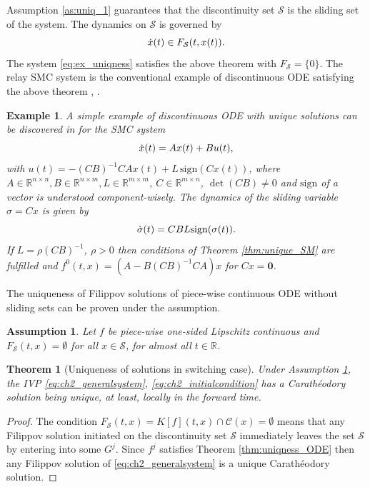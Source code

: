 \documentclass{article}
\newcommand{\R}{\mathbb{R}}
\newcommand{\zero}{\mathbf{0}}
\newcommand{\sign}{\mathrm{sign}}
\newtheorem{theorem}{Theorem}
\newtheorem{example}{Example}
\newtheorem{assumption}{Assumption}
\begin{document}
{ Assumption \ref{as:uniq_1} guarantees that the discontinuity set $\mathcal{S}$ is the sliding set of the system. The dynamics on $\mathcal{S}$ is governed by \vspace{-1mm}
	\begin{equation}
		\dot x(t)\in F_{\mathcal{S}}(t,x(t)).\vspace{-1mm}
	\end{equation}
The system \eqref{eq:ex_uniqness} satisfies the above theorem with $F_{\mathcal{S}}=\{0\}$. }
The relay SMC system is the conventional example of discontinuous ODE satisfying the above theorem \cite{Utkin1992:Book}, \cite{Filippov1988:Book}.
\begin{example}\label{ex:2}\itshape
A simple example of discontinuous ODE with unique solutions can be  discovered in  \cite{Utkin1992:Book} for the SMC system\vspace{-1mm}
	\begin{equation}\label{eq:examp_SMC_relay}
	\dot x(t)=Ax(t)+Bu(t),\vspace{-1mm}
\end{equation} 
with $u(t)=-(CB)^{-1}CAx(t)+L \,\sign(Cx(t))$,
where $A\in \R^{n\times n}, B\in \R^{n\times m},L\in \R^{m\times m}$, $C\in \R^{m\times n}$, $\det(CB)\neq 0$ and $\sign$ of a vector is understood component-wisely. 
The dynamics of the sliding variable $\sigma=Cx$ is given by\vspace{-1mm}
\[
\dot \sigma(t)=CBL\sign(\sigma(t)).\vspace{-1mm}
\]
If $L\!=\!\rho (CB)^{-1}$, $\rho\! >\! 0$ then conditions of Theorem \ref{thm:unique_SM} are fulfilled and $f^0(t,x)\!=\!(A\!-\!B(CB)^{-1}CA)x$  for $Cx\!=\!\zero$.
\end{example}
The uniqueness of Filippov solutions of piece-wise continuous ODE without sliding sets can be proven under the assumption. 
\begin{assumption}\label{as:uniq_2}\itshape
	Let $f$ be piece-wise {one-sided Lipschitz} continuous
	and 
	$F_{\mathcal{S}}(t,x)=\emptyset$ for all $x\in \mathcal{S}$,
	for almost all $t\in\R$.
\end{assumption}
\begin{theorem}[\small Uniqueness of solutions in switching case]\label{thm:unique_no_SM}\itshape
	 Under Assumption \ref{as:uniq_2}, the IVP  \eqref{eq:ch2_generalsystem}, \eqref{eq:ch2_initialcondition}  has a Carath\'{e}odory  solution being unique,  at least, locally in the forward time. 	
\end{theorem}
\begin{proof}
The condition $	F_{\mathcal{S}}(t,x)=K[f](t,x)\cap\mathcal{C}(x)=\emptyset$ means that any  Filippov solution initiated on the discontinuity set $\mathcal{S}$ immediately leaves the set $\mathcal{S}$ by entering into  some $G^j$.
Since $f^j$  satisfies Theorem \ref{thm:uniqness_ODE} then any Filippov solution  of \eqref{eq:ch2_generalsystem} is a unique
Carath\'{e}odory solution.
\end{proof}
\end{document}
